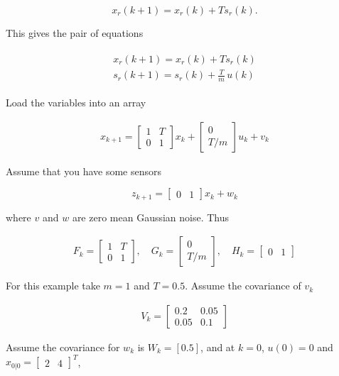 \[x_r(k+1) = x_r(k) + T s_r(k).\]

This gives the pair of equations

\[\begin{aligned}
\begin{array}{l}
x_r(k+1) = x_r(k) + T s_r(k) \\
s_r(k+1) = s_r(k) + \frac{T}{m} \, u(k)
\end{array}
\end{aligned}\]

Load the variables into an array

\[\begin{aligned}
x_{k+1} = \begin{bmatrix}1 & T \\ 0 & 1\end{bmatrix} x_k
  + \begin{bmatrix} 0 \\ T/m \end{bmatrix}u_k + v_k
\end{aligned}\]

Assume that you have some sensors

\[z_{k+1} = \begin{bmatrix}0 & 1\end{bmatrix} x_k + w_k\]

where \(v\) and \(w\) are zero mean Gaussian noise. Thus

\[\begin{aligned}
F_k = \begin{bmatrix} 1 & T \\ 0 & 1\end{bmatrix}, \quad
  G_k = \begin{bmatrix} 0 \\ T/m \end{bmatrix}, \quad
  H_k = \begin{bmatrix} 0 & 1\end{bmatrix}
\end{aligned}\]

For this example take \(m=1\) and \(T=0.5\). Assume the covariance of
\(v_k\)

\[\begin{aligned}
V_k = \begin{bmatrix}0.2 & 0.05 \\ 0.05 & 0.1\end{bmatrix}
\end{aligned}\]

Assume the covariance for \(w_k\) is \(W_k = [0.5]\), and at \(k=0\),
\(u(0) = 0\) and
\(\hat{x}_{0|0} = \begin{bmatrix}2 & 4\end{bmatrix}^T\),

